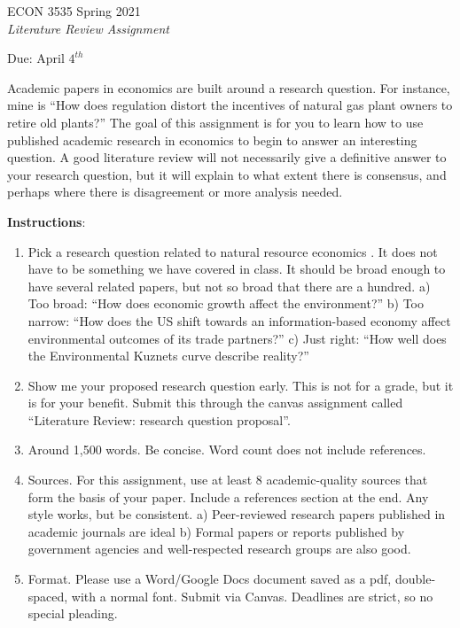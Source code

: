 \documentclass[11pt]{article}
\author{\normalsize Kyle Butts\\{\footnotesize Univ. of Colorado, Boulder}}
\date{\footnotesize\today}
\begin{document}
\begin{center}
    \color{navyblue}
    {\Large ECON 3535 Spring 2021 \\ \textit{Literature Review Assignment}}

    Due: April $4^{th}$
\end{center}

\noindent
Academic papers in economics are built around a research question. For instance, mine is ``How does regulation distort the incentives of natural gas plant owners to retire old plants?'' The goal of this assignment is for you to learn how to use published academic research in economics to begin to answer an interesting question. A good literature review will not necessarily give a definitive answer to your research question, but it will explain to what extent there is consensus, and perhaps where there is disagreement or more analysis needed.

\noindent
\textbf{Instructions}: 

\begin{enumerate}
    \item  Pick a research question related to natural resource economics . It does not have to be something we have covered in class. It should be broad enough to have several related papers, but not so broad that there are a hundred.
    a) Too broad: ``How does economic growth affect the environment?''
    b) Too narrow: ``How does the US shift towards an information-based economy affect environmental outcomes of its trade partners?''
    c) Just right: ``How well does the Environmental Kuznets curve describe reality?''

    \item  Show me your proposed research question early. This is not for a grade, but it is for your benefit. Submit this through the canvas assignment called ``Literature Review: research question proposal''.
    
    \item  Around 1,500 words. Be concise. Word count does not include references.
    
    \item  Sources. For this assignment, use at least 8 academic-quality sources that form the basis of your paper. Include a references section at the end. Any style works, but be consistent.
    a) Peer-reviewed research papers published in academic journals are ideal
    b) Formal papers or reports published by government agencies and well-respected research groups are also good.
    
    \item  Format. Please use a Word/Google Docs document saved as a pdf, double-spaced, with a normal font. Submit via Canvas. Deadlines are strict, so no special pleading.
\end{enumerate}
\end{document}
